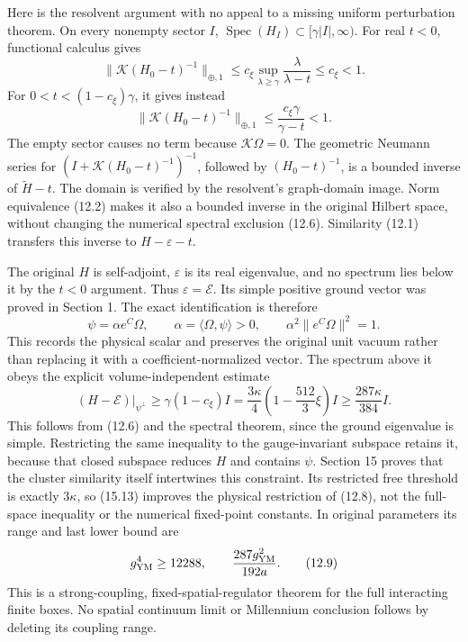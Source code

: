 \documentclass[
]{article}
\begin{document}
Here is the resolvent argument with no appeal to a missing uniform
perturbation theorem. On every nonempty sector \(I\),
\(\operatorname{Spec}(H_I)\subset[\gamma|I|,\infty)\). For real \(t<0\),
functional calculus gives \[
\|\mathcal K(H_0-t)^{-1}\|_{\oplus,1}
 \le c_\xi\sup_{\lambda\ge\gamma}
          \frac{\lambda}{\lambda-t}\le c_\xi<1.
\] For \(0<t<(1-c_\xi)\gamma\), it gives instead \[
\|\mathcal K(H_0-t)^{-1}\|_{\oplus,1}
 \le\frac{c_\xi\gamma}{\gamma-t}<1.                           \tag{12.6}
\] The empty sector causes no term because \(\mathcal K\Omega=0\). The
geometric Neumann series for \((I+\mathcal K(H_0-t)^{-1})^{-1}\),
followed by \((H_0-t)^{-1}\), is a bounded inverse of
\(\widetilde H-t\). The domain is verified by the resolvent's
graph-domain image. Norm equivalence (12.2) makes it also a bounded
inverse in the original Hilbert space, without changing the numerical
spectral exclusion (12.6). Similarity (12.1) transfers this inverse to
\(H-\varepsilon-t\).

The original \(H\) is self-adjoint, \(\varepsilon\) is its real
eigenvalue, and no spectrum lies below it by the \(t<0\) argument. Thus
\(\varepsilon=\mathcal E\). Its simple positive ground vector was proved
in Section 1. The exact identification is therefore \[
\psi=\alpha e^C\Omega,\qquad
\alpha=\langle\Omega,\psi\rangle>0,\qquad
\alpha^2\|e^C\Omega\|^2=1.                                  \tag{12.7}
\] This records the physical scalar and preserves the original unit
vacuum rather than replacing it with a coefficient-normalized vector.
The spectrum above it obeys the explicit volume-independent estimate \[
(H-\mathcal E)\big|_{\psi^\perp}
 \ge\gamma(1-c_\xi)I
 =\frac{3\kappa}{4}\left(1-\frac{512}{3}\xi\right)I
 \ge\frac{287\kappa}{384}I .                                \tag{12.8}
\] This follows from (12.6) and the spectral theorem, since the ground
eigenvalue is simple. Restricting the same inequality to the
gauge-invariant subspace retains it, because that closed subspace
reduces \(H\) and contains \(\psi\). Section 15 proves that the cluster
similarity itself intertwines this constraint. Its restricted free
threshold is exactly \(3\kappa\), so (15.13) improves the physical
restriction of (12.8), not the full-space inequality or the numerical
fixed-point constants. In original parameters its range and last lower
bound are \[
g_{\rm YM}^4\ge12288,\qquad
\frac{287g_{\rm YM}^2}{192a}.
                                                               \tag{12.9}
\] This is a strong-coupling, fixed-spatial-regulator theorem for the
full interacting finite boxes. No spatial continuum limit or Millennium
conclusion follows by deleting its coupling range.
\end{document}
